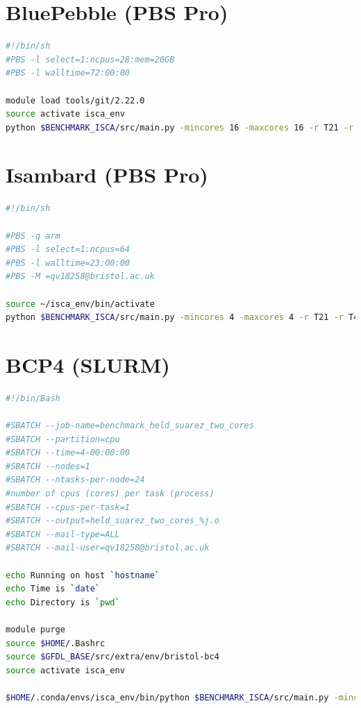 \documentclass[a4paper,11pt]{report}
\begin{document}
\section*{BluePebble (PBS Pro)}
\begin{lstlisting}[language=Bash]
#!/bin/sh
#PBS -l select=1:ncpus=28:mem=20GB
#PBS -l walltime=72:00:00

module load tools/git/2.22.0
source activate isca_env
python $BENCHMARK_ISCA/src/main.py -mincores 16 -maxcores 16 -r T21 -r T42 -codebase grey_mars -fc kind_4
\end{lstlisting}



\section*{Isambard (PBS Pro)}
\begin{lstlisting}[language=Bash]
#!/bin/sh

#PBS -q arm
#PBS -l select=1:ncpus=64
#PBS -l walltime=23:00:00
#PBS -M =qv18258@bristol.ac.uk

source ~/isca_env/bin/activate
python $BENCHMARK_ISCA/src/main.py -mincores 4 -maxcores 4 -r T21 -r T42 -r T85 -codebase held_suarez -fc cray_temp
\end{lstlisting}

\section*{BCP4 (SLURM)}

\begin{lstlisting}[language=Bash]
#!/bin/Bash

#SBATCH --job-name=benchmark_held_suarez_two_cores
#SBATCH --partition=cpu
#SBATCH --time=4-00:00:00
#SBATCH --nodes=1
#SBATCH --ntasks-per-node=24
#number of cpus (cores) per task (process)
#SBATCH --cpus-per-task=1
#SBATCH --output=held_suarez_two_cores_%j.o
#SBATCH --mail-type=ALL
#SBATCH --mail-user=qv18258@bristol.ac.uk

echo Running on host `hostname`
echo Time is `date`
echo Directory is `pwd`

module purge
source $HOME/.Bashrc
source $GFDL_BASE/src/extra/env/bristol-bc4
source activate isca_env

$HOME/.conda/envs/isca_env/bin/python $BENCHMARK_ISCA/src/main.py -mincores 2 -maxcores 2 -r T21 -r T42 -codebase held_suarez -fc gcc
\end{lstlisting}
\end{document}
